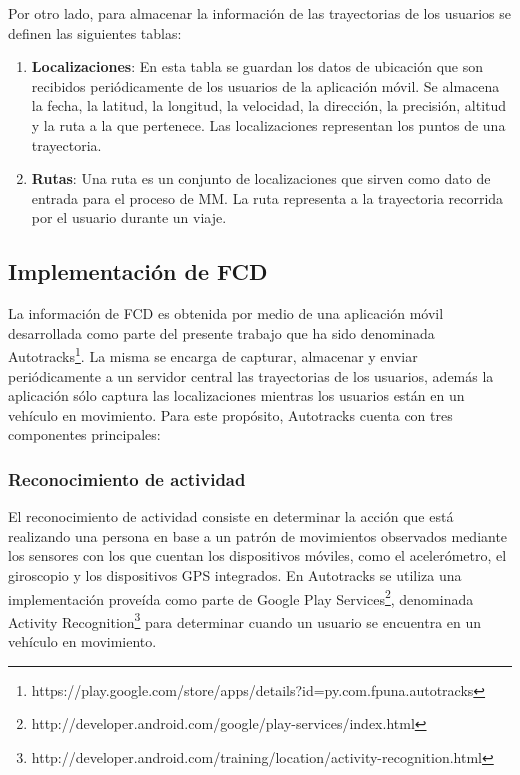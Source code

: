 Por otro lado, para almacenar la información de las trayectorias de los usuarios se definen las siguientes tablas:
\begin{enumerate}
\item \textbf{Localizaciones}: En esta tabla se guardan los datos de ubicación que son recibidos periódicamente de los usuarios de la aplicación móvil. Se almacena la fecha, la latitud, la longitud, la velocidad, la dirección, la precisión, altitud y la ruta a la que pertenece. Las localizaciones representan los puntos de una trayectoria.
\item \textbf{Rutas}: Una ruta es un conjunto de localizaciones que sirven como dato de entrada para el proceso de MM. La ruta representa a la trayectoria recorrida por el usuario durante un viaje.
\end{enumerate}

\subsection{Implementación de FCD}
\label{floating-car-data}

La información de FCD es obtenida por medio de una aplicación móvil desarrollada como parte del presente trabajo que ha sido denominada Autotracks\footnote{https://play.google.com/store/apps/details?id=py.com.fpuna.autotracks}. La misma se encarga de capturar, almacenar y enviar periódicamente a un servidor central las trayectorias de los usuarios, además la aplicación sólo captura las localizaciones mientras los usuarios están en un vehículo en movimiento. Para este propósito, Autotracks cuenta con tres componentes principales: 

\subsubsection{Reconocimiento de actividad}
\label{reconocimiento_actividad}

El reconocimiento de actividad consiste en determinar la acción que está realizando una persona en base a un patrón de movimientos observados mediante los sensores con los que cuentan los dispositivos móviles, como el acelerómetro, el giroscopio y los dispositivos GPS integrados. En Autotracks se utiliza una implementación proveída como parte de Google Play Services\footnote{http://developer.android.com/google/play-services/index.html}, denominada Activity Recognition\footnote{http://developer.android.com/training/location/activity-recognition.html} para determinar cuando un usuario se encuentra en un vehículo en movimiento.

